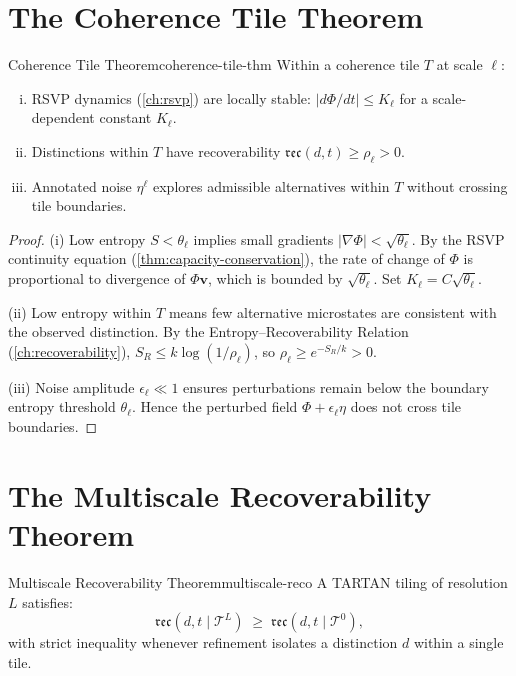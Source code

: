 \documentclass[12pt,twoside,openright]{book}
\newcommand{\reco}{\mathfrak{rec}}
\begin{document}
\section{The Coherence Tile Theorem}

\begin{theorem}{Coherence Tile Theorem}{coherence-tile-thm}
  Within a coherence tile $T$ at scale $\ell$:
  \begin{enumerate}[(i)]
    \item RSVP dynamics (\cref{ch:rsvp}) are locally
          stable: $|d\Phi/dt| \le K_\ell$ for a
          scale-dependent constant $K_\ell$.
    \item Distinctions within $T$ have recoverability
          $\reco(d, t) \ge \rho_\ell > 0$.
    \item Annotated noise $\eta^\ell$ explores
          admissible alternatives within $T$ without
          crossing tile boundaries.
  \end{enumerate}
\end{theorem}

\begin{proof}
  (i) Low entropy $S < \theta_\ell$ implies small
  gradients $|\nabla\Phi| < \sqrt{\theta_\ell}$.
  By the RSVP continuity equation
  (\cref{thm:capacity-conservation}), the rate of
  change of $\Phi$ is proportional to divergence of
  $\Phi \mathbf{v}$, which is bounded by
  $\sqrt{\theta_\ell}$. Set
  $K_\ell = C\sqrt{\theta_\ell}$.

  (ii) Low entropy within $T$ means few alternative
  microstates are consistent with the observed
  distinction. By the Entropy--Recoverability Relation
  (\cref{ch:recoverability}), $S_R \le k\log(1/\rho_\ell)$,
  so $\rho_\ell \ge e^{-S_R/k} > 0$.

  (iii) Noise amplitude $\epsilon_\ell \ll 1$ ensures
  perturbations remain below the boundary entropy
  threshold $\theta_\ell$. Hence the perturbed field
  $\Phi + \epsilon_\ell \eta$ does not cross tile
  boundaries.
\end{proof}

\section{The Multiscale Recoverability Theorem}

\begin{theorem}{Multiscale Recoverability Theorem}{multiscale-reco}
  A TARTAN tiling of resolution $L$ satisfies:
  \[
    \reco(d, t \mid \mathcal{T}^L)
    \;\ge\;
    \reco(d, t \mid \mathcal{T}^0),
  \]
  with strict inequality whenever refinement isolates
  a distinction $d$ within a single tile.
\end{theorem}
\end{document}
